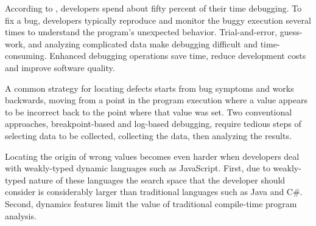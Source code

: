 \documentclass{sig-alternate}
\begin{document}
According to  \cite{LaToza}, developers spend about fifty percent of
their time debugging. To fix a bug, developers typically reproduce 
and monitor the buggy execution several times to understand the 
program's unexpected behavior. Trial-and-error, guess-work, and 
analyzing complicated data make debugging difficult and time-consuming. 
Enhanced debugging operations save  
time, reduce development costs and improve software quality.

A common strategy for locating defects starts from bug symptoms and
works backwards, moving from a point in the program execution where a
value appears to be incorrect back to the point where that value was
set.  Two conventional approaches, breakpoint-based and
log-based debugging, require tedious steps of
selecting data to be collected, collecting the data, then analyzing
the results. 



Locating the origin of wrong values becomes even harder when developers 
deal with weakly-typed dynamic languages such as JavaScript. First, due to weakly-typed
nature of these languages the search space that the developer should consider is considerably 
larger than traditional languages such as Java and C{\small\#}. Second, dynamics features limit 
the value of traditional compile-time program analysis.
\end{document}
